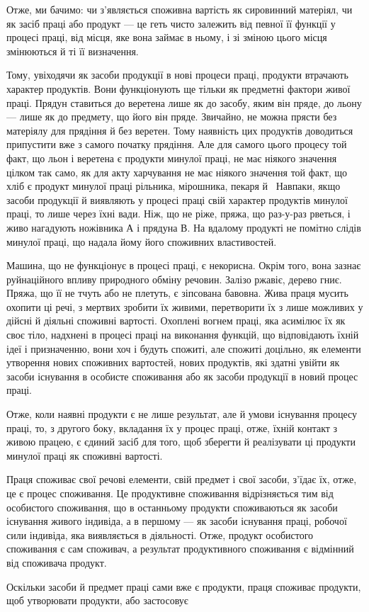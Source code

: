 
Отже, ми бачимо: чи з’являється споживна вартість як сировинний
матеріял, чи як засіб праці або продукт — це геть чисто
залежить від певної її функції у процесі праці, від місця, яке
вона займає в ньому, і зі зміною цього місця змінюються й ті
її визначення.

Тому, увіходячи як засоби продукції в нові процеси праці,
продукти втрачають характер продуктів. Вони функціонують
ще тільки як предметні фактори живої праці. Прядун ставиться
до веретена лише як до засобу, яким він пряде, до льону — лише
як до предмету, що його він пряде. Звичайно, не можна прясти
без матеріялу для прядіння й без веретен. Тому наявність цих
продуктів доводиться припустити вже з самого початку прядіння.
Але для самого цього процесу той факт, що льон і веретена є
продукти минулої праці, не має ніякого значення цілком так
само, як для акту харчування не має ніякого значення той факт,
що хліб є продукт минулої праці рільника, мірошника, пекаря
й~ Навпаки, якщо засоби продукції й виявляють у процесі
праці свій характер продуктів минулої праці, то лише через їхні
вади. Ніж, що не ріже, пряжа, що раз-у-раз рветься, і~
живо нагадують ножівника $А$ і прядуна $В$. На вдалому продукті
не помітно слідів минулої праці, що надала йому його споживних
властивостей.

Машина, що не функціонує в процесі праці, є некорисна.
Окрім того, вона зазнає руйнаційного впливу природного обміну
речовин. Залізо ржавіє, дерево гниє. Пряжа, що її не тчуть або
не плетуть, є зіпсована бавовна. Жива праця мусить охопити
ці речі, з мертвих зробити їх живими, перетворити їх з лише
можливих у дійсні й діяльні споживні вартості. Охоплені вогнем
праці, яка асимілює їх як своє тіло, надхнені в процесі праці на виконання
функцій, що відповідають їхній ідеї і призначенню, вони
хоч і будуть спожиті, але спожиті доцільно, як елементи утворення
нових споживних вартостей, нових продуктів, які здатні
увійти як засоби існування в особисте споживання або як засоби
продукції в новий процес праці.

Отже, коли наявні продукти є не лише результат, але й умови
існування процесу праці, то, з другого боку, вкладання їх у
процес праці, отже, їхній контакт з живою працею, є єдиний
засіб для того, щоб зберегти й реалізувати ці продукти минулої
праці як споживні вартості.

Праця споживає свої речові елементи, свій предмет і свої
засоби, з’їдає їх, отже, це є процес споживання. Це продуктивне
споживання відрізняється тим від особистого споживання, що в
останньому продукти споживаються як засоби існування живого
індивіда, а в першому — як засоби існування праці, робочої
сили індивіда, яка виявляється в діяльності. Отже, продукт особистого
споживання є сам споживач, а результат продуктивного
споживання є відмінний від споживача продукт.

Оскільки засоби й предмет праці сами вже є продукти, праця
споживає продукти, щоб утворювати продукти, або застосовує
\parbreak{}  %
